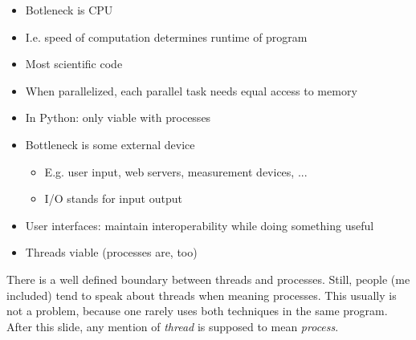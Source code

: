 \begin{frame}
%
\begin{tcbraster}[raster columns=2,
                  raster equal height,
                  nobeforeafter,
                  raster column skip=0.5cm]
\begin{defbox}
\small
\begin{itemize}
\setlength{\itemsep}{0pt}
\item Botleneck is CPU
\item I.\;e. speed of computation determines runtime of program
\item Most scientific code
\item When parallelized, each parallel task needs equal access to memory
\item[\Thus] In Python: only viable with processes
\end{itemize}
\end{defbox}
\begin{defbox}
\small
\begin{itemize}
\setlength{\itemsep}{0pt}
\item Bottleneck is some external device
	\begin{itemize}
	\setlength{\itemsep}{0pt}
	\item E.\;g. user input, web servers, measurement devices, ...
	\item I/O stands for input output
	\end{itemize}
\item User interfaces: maintain interoperability while doing something useful 
\item[\Thus] Threads viable (processes are, too)
\end{itemize}
\end{defbox}
\end{tcbraster}
%
\begin{hintbox}
\footnotesize
There is a well defined boundary between threads and processes. Still, people (me included) tend to speak about threads when meaning processes. 
This usually is not a problem, because one rarely uses both techniques in the same program. After this slide, any mention of \emph{thread} is supposed to mean \emph{process}.
\end{hintbox}
%
\end{frame}


